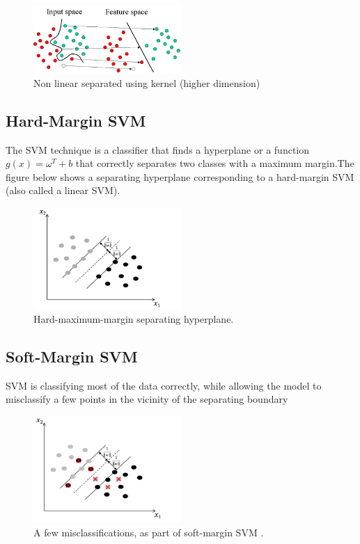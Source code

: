 \begin{figure}[H]
\centering
\includegraphics[width=0.5\textwidth]{img/SVMIntro3.png}
\caption{Non linear separated using kernel (higher dimension) }
\label{124 }
\end{figure}


\subsection{Hard-Margin SVM}
The SVM technique is a classifier that finds a hyperplane or a function $g(x) = {\omega}^T +  b$   that correctly separates two classes with a maximum margin.The figure below shows a separating hyperplane corresponding to a hard-margin SVM (also called a linear SVM).

\begin{figure}[H]
\centering
\includegraphics[width=0.5\textwidth]{img/hardmargin.PNG}
\caption{ Hard-maximum-margin separating hyperplane. }
\label{125 }
\end{figure}


\subsection{Soft-Margin SVM}
SVM is classifying most of the data correctly, while allowing the model to misclassify a few points in the vicinity of the separating boundary

\begin{figure}[H]
\centering
\includegraphics[width=0.5\textwidth]{img/softmargin.PNG}
\caption{  A few misclassifications, as part of soft-margin SVM . }
\label{126 }
\end{figure}


